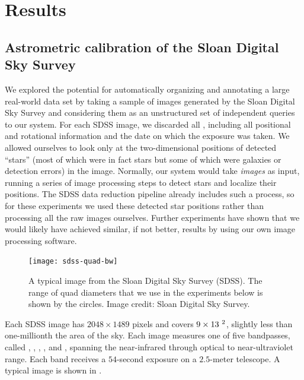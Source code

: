 

\section{Results}

\subsection{Astrometric calibration of the Sloan Digital Sky Survey}

We explored the potential for automatically organizing and annotating
a large real-world data set by taking a sample of images generated by
the Sloan Digital Sky Survey and considering them as an unstructured
set of independent queries to our system.  For each SDSS image, we
discarded all \metadata, including all positional and rotational
information and the date on which the exposure was taken.  We allowed
ourselves to look only at the two-dimensional positions of detected
``stars'' (most of which were in fact stars but some of which were
galaxies or detection errors) in the image.  Normally, our system
would take \emph{images} as input, running a series of image
processing steps to detect stars and localize their positions.  The
SDSS data reduction pipeline already includes such a process, so for
these experiments we used these detected star positions rather than
processing all the raw images ourselves.  Further experiments have
shown that we would likely have achieved similar, if not better,
results by using our own image processing software.


\begin{figure}[htp]
\begin{center}
\texttt{[image: sdss-quad-bw]}
\end{center}
\caption{A typical image from the Sloan Digital Sky Survey (SDSS).
The range of quad diameters that we use in the experiments below is
shown by the circles.  Image credit: Sloan Digital Sky Survey.
\label{fig:sdss}}
\end{figure}


Each SDSS image has $2048\times1489$ pixels and covers
$9\times13~^2$, slightly less than one-millionth the area of
the sky.  Each image measures one of five bandpasses, called \uband,
\gband, \rband, \iband, and \zband, spanning the near-infrared through
optical to near-ultraviolet range.  Each band receives a $54$-second
exposure on a $2.5$-meter telescope.  A typical image is shown in
.


